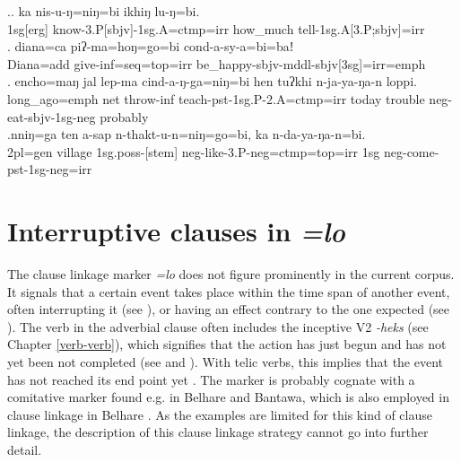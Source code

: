 \ex.\ag. ka nis-u-ŋ=niŋ=bi ikhiŋ lu-ŋ=bi.\\
	{\sc 1sg[erg]} 	know{\sc -3.P[sbjv]-1sg.A=ctmp=irr} how\_much tell{\sc -1sg.A[3.P;sbjv]=irr}\\
	 \bg. diana=ca  piʔ-ma=hoŋ=go=bi   cond-a-sy-a=bi=baǃ\\
	Diana{\sc =add} give{\sc -inf=seq=top=irr} be\_happy{\sc -sbjv-mddl-sbjv[3sg]=irr=emph}\\
	 
	\bg. encho=maŋ     jal lep-ma   cind-a-ŋ-ga=niŋ=bi     hen   tuʔkhi n-ja-ya-ŋa-n    loppi.\\
	long\_ago{\sc =emph} net throw{\sc -inf} teach{\sc -pst-1sg.P-2.A=ctmp=irr} today trouble {\sc neg-}eat{\sc -sbjv-1sg-neg} probably\\
	 
	\bg.nniŋ=ga ten a-sap n-thakt-u-n=niŋ=go=bi, ka n-da-ya-ŋa-n=bi.\\
	{\sc 2pl=gen} village {\sc 1sg.poss-[stem]} {\sc neg-}like{\sc -3.P-neg=ctmp=top=irr} {\sc 1sg} {\sc neg-}come{\sc -pst-1sg-neg=irr}\\

 

\section{Interruptive clauses in \emph{=lo}}\label{adv-cl-int}

The clause linkage marker \emph{=lo} does not figure prominently in the current corpus. It signals that a certain event takes place within the time span of another event, often interrupting it (see \Next[a]), or having an effect  contrary to the one expected (see \Next[b]). The verb in the adverbial clause often includes the inceptive V2 \emph{-heks} (see Chapter \ref{verb-verb}), which signifies that the action has just begun and has not yet been not completed (see \Next[a] and \Next[b]). With telic verbs, this implies that the event has not reached its end point yet \Next[c]. The marker is probably cognate with a comitative marker found e.g. in Belhare and Bantawa, which is also employed in clause linkage in Belhare \citep{Bickel1993Belhare, Doornenbal2009A-grammar}. As the examples are limited for this kind of clause linkage, the description of this clause linkage strategy cannot go into further detail.

